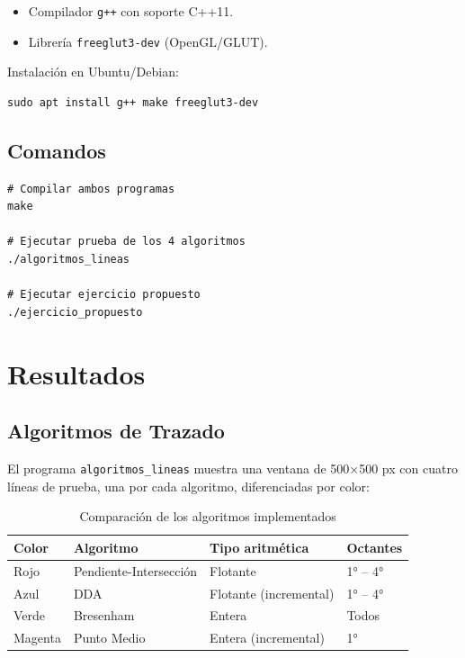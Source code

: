 \documentclass[12pt,a4paper]{article}
\begin{document}
\begin{itemize}
  \item Compilador \texttt{g++} con soporte C++11.
  \item Librería \texttt{freeglut3-dev} (OpenGL/GLUT).
\end{itemize}

Instalación en Ubuntu/Debian:
\begin{verbatim}
sudo apt install g++ make freeglut3-dev
\end{verbatim}

\subsection{Comandos}

\begin{verbatim}
# Compilar ambos programas
make

# Ejecutar prueba de los 4 algoritmos
./algoritmos_lineas

# Ejecutar ejercicio propuesto
./ejercicio_propuesto
\end{verbatim}

\section{Resultados}

\subsection{Algoritmos de Trazado}

El programa \texttt{algoritmos\_lineas} muestra una ventana de 500×500 px con
cuatro líneas de prueba, una por cada algoritmo, diferenciadas por color:

\begin{table}[H]
  \centering
  \begin{tabular}{llll}
    \toprule
    \textbf{Color}  & \textbf{Algoritmo}        & \textbf{Tipo aritmética} & \textbf{Octantes} \\
    \midrule
    Rojo            & Pendiente-Intersección    & Flotante                 & 1° -- 4°          \\
    Azul            & DDA                       & Flotante (incremental)   & 1° -- 4°          \\
    Verde           & Bresenham                 & Entera                   & Todos             \\
    Magenta         & Punto Medio               & Entera (incremental)     & 1°                \\
    \bottomrule
  \end{tabular}
  \caption{Comparación de los algoritmos implementados}
\end{table}
\end{document}
